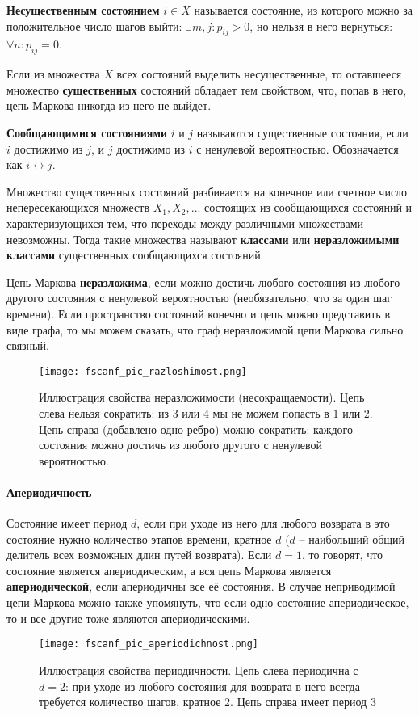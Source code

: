\textbf{Несущественным состоянием} $i \in X$ называется состояние, из которого можно за положительное число шагов выйти: $\exists m, j : p_{ij} > 0$, но нельзя в него вернуться: $\forall n : p_{ij} = 0$.

Если из множества $X$ всех состояний выделить несущественные, то оставшееся множество \textbf{существенных} состояний обладает тем свойством, что, попав в него, цепь Маркова никогда из него не выйдет.

\textbf{Сообщающимися состояниями} $i$ и $j$ называются существенные состояния, если $i$ достижимо из $j$, и $j$ достижимо из $i$ с ненулевой вероятностью. Обозначается как $i \leftrightarrow j$.

Множество существенных состояний разбивается на конечное или счетное число непересекающихся множеств $X_1 , X_2 , ...$ состоящих из сообщающихся состояний и характеризующихся тем, что переходы между различными множествами невозможны. Тогда такие множества называют \textbf{классами} или \textbf{неразложимыми классами} существенных сообщающихся состояний.

Цепь Маркова \textbf{неразложима}, если можно достичь любого состояния из любого другого состояния с ненулевой вероятностью (необязательно, что за один шаг времени). Если пространство состояний конечно и цепь можно представить в виде графа, то мы можем сказать, что граф неразложимой цепи Маркова сильно связный.
\begin{figure}[H]
    \centering
    \texttt{[image: fscanf\_pic\_razloshimost.png]}
    \caption{Иллюстрация свойства неразложимости (несокращаемости). Цепь слева нельзя сократить: из $3$ или $4$ мы не можем попасть в $1$ или $2$. Цепь справа (добавлено одно ребро) можно сократить: каждого состояния можно достичь из любого другого с ненулевой вероятностью.}
\end{figure}

\paragraph{Апериодичность}

Состояние имеет период $d$, если при уходе из него для любого возврата в это состояние нужно количество этапов времени, кратное $d$ ($d$ -- наибольший общий делитель всех возможных длин путей возврата). Если $d = 1$, то говорят, что состояние является апериодическим, а вся цепь Маркова является \textbf{апериодической}, если апериодичны все её состояния. В случае неприводимой цепи Маркова можно также упомянуть, что если одно состояние апериодическое, то и все другие тоже являются апериодическими.
\begin{figure}[H]
    \centering
    \texttt{[image: fscanf\_pic\_aperiodichnost.png]}
    \caption{Иллюстрация свойства периодичности. Цепь слева периодична с $d = 2$: при уходе из любого состояния для возврата в него всегда требуется количество шагов, кратное $2$. Цепь справа имеет период $3$}
\end{figure}

